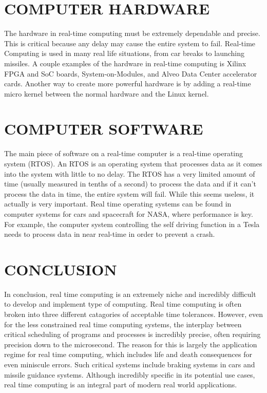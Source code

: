\documentclass[letterpaper, 10 pt, conference]{IEEEconf}
\begin{document}
\section{COMPUTER HARDWARE}
The hardware in real-time computing must be extremely dependable and precise.
 This is critical because any delay may cause the entire system to fail.
  Real-time Computing is used in many real life situations, from car breaks to launching missiles. 
  A couple examples of the hardware in real-time computing is Xilinx FPGA and
   SoC boards, System-on-Modules, and Alveo Data Center accelerator cards.
    Another way to create more powerful hardware is by adding a real-time micro kernel 
    between the normal hardware and the Linux kernel. 

\section{COMPUTER SOFTWARE}

The main piece of software on a real-time computer is a real-time operating system (RTOS). An RTOS is an operating system
that processes data as it comes into the system with little to no delay. The RTOS has a very limited amount of time (usually
measured in tenths of a second) to process the data and if it can't process the data in time, the entire system will fail. While this seems useless, it actually
is very important. Real time operating systems can be found in computer systems for cars and spacecraft for NASA, where performance
is key. For example, the computer system controlling the self driving function in a Tesla needs to process data in near real-time
in order to prevent a crash.

\section{CONCLUSION}
In conclusion, real time computing is an extremely niche and incredibly difficult to develop and implement type of computing. Real time computing is often broken into three different catagories of acceptable time tolerances. However, even for the less constrained real time computing systems, the interplay between critical scheduling of programs and processes is incredibly precise, often requiring precision down to the microsecond. The reason for this is largely the application regime for real time computing, which includes life and death consequences for even miniscule errors. Such critical systems include braking systems in cars and missile guidance systems. Although incredibly specific in its potential use cases, real time computing is an integral part of modern real world applications.
\end{document}
